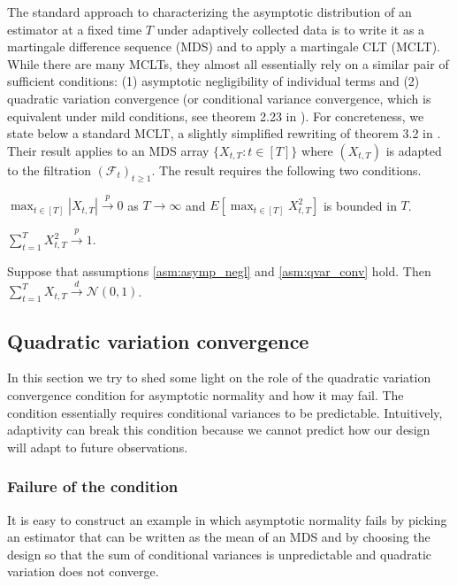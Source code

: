 The standard approach to characterizing the asymptotic distribution of an estimator at a fixed time $T$ under adaptively collected data is to write it as a martingale difference sequence (MDS) and to apply a martingale CLT (MCLT).
While there are many MCLTs, they almost all essentially rely on a similar pair of sufficient conditions: (1) asymptotic negligibility of individual terms and (2) quadratic variation convergence (or conditional variance convergence, which is equivalent under mild conditions, see theorem 2.23 in \citealp{hall2014martingale}). For concreteness, we state below a standard MCLT, a slightly simplified rewriting of theorem 3.2 in \cite{hall2014martingale}. Their result applies to an MDS array $\{ X_{t,T} : t\in [T] \}$ where $(X_{t,T})$ is adapted to the filtration $(\mathcal{F}_t)_{t \geq 1 }$. The result requires the following two conditions.

\begin{assumption}\label{asm:asymp_negl}
    $\max_{t\in [T]} |X_{t,T}| \xrightarrow{p} 0$ as $T \to \infty$ and $E[\max_{t \in [T]} X_{t,T}^2]$ is bounded in $T$. 
\end{assumption}

\begin{assumption}\label{asm:qvar_conv}
    $\sum_{t=1}^T X_{t,T}^2 \xrightarrow{p} 1$.
\end{assumption}
\begin{theorem}
    Suppose that assumptions \ref{asm:asymp_negl} and \ref{asm:qvar_conv} hold. Then $\sum_{t=1}^T X_{t,T} \xrightarrow{d} \mathcal{N}(0,1)$.
\end{theorem}

\subsection{Quadratic variation convergence}

In this section we try to shed some light on the role of the quadratic variation convergence condition for asymptotic normality and how it may fail. The condition essentially requires conditional variances to be predictable. Intuitively, adaptivity can break this condition because we cannot predict how our design will adapt to future observations.

\subsubsection{Failure of the condition} It is easy to construct an example in which asymptotic normality fails by picking an estimator that can be written as the mean of an MDS and by choosing the design so that the sum of conditional variances is unpredictable and quadratic variation does not converge.

